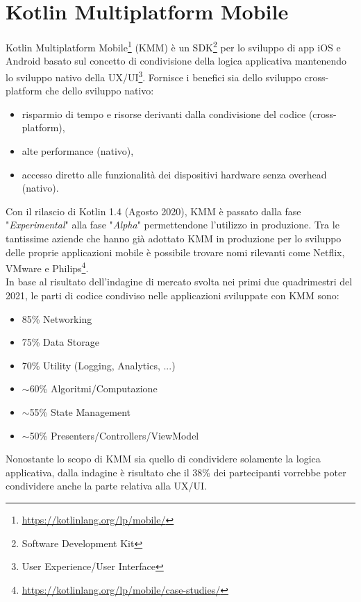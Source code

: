 
\section{Kotlin Multiplatform Mobile}
Kotlin Multiplatform Mobile\footnote{\url{https://kotlinlang.org/lp/mobile/}} (KMM) è un SDK\footnote{Software Development Kit} per lo sviluppo di app iOS e Android basato sul concetto di condivisione della logica applicativa mantenendo lo sviluppo nativo della UX/UI\footnote{User Experience/User Interface}. Fornisce i benefici sia dello sviluppo cross-platform che dello sviluppo nativo:
\begin{itemize}
    \item risparmio di tempo e risorse derivanti dalla condivisione del codice (cross-platform),
    \item alte performance (nativo),
    \item accesso diretto alle funzionalità dei dispositivi hardware senza overhead (nativo).
\end{itemize}
Con il rilascio di Kotlin 1.4 (Agosto 2020), KMM è passato dalla fase "\textit{Experimental}" alla fase "\textit{Alpha}" permettendone l'utilizzo in produzione. Tra le tantissime aziende che hanno già adottato KMM in produzione per lo sviluppo delle proprie applicazioni mobile è possibile trovare nomi rilevanti come Netflix, VMware e Philips\footnote{\url{https://kotlinlang.org/lp/mobile/case-studies/}}.\\
In base al risultato dell'indagine di mercato svolta nei primi due quadrimestri del 2021\cite{kmm2}, le parti di codice condiviso nelle applicazioni sviluppate con KMM sono:
\begin{itemize}
    \item 85\% Networking
    \item 75\% Data Storage
    \item 70\% Utility (Logging, Analytics, ...)
    \item $\sim$60\% Algoritmi/Computazione
    \item $\sim$55\% State Management
    \item $\sim$50\% Presenters/Controllers/ViewModel
\end{itemize}
Nonostante lo scopo di KMM sia quello di condividere solamente la logica applicativa, dalla indagine è risultato che il 38\% dei partecipanti vorrebbe poter condividere anche la parte relativa alla UX/UI.

